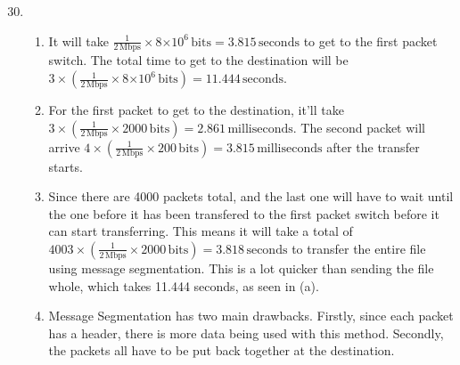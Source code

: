 \documentclass[12pt]{article}
\newcommand{\s}[1]{\setcounter{enumi}{#1}}
\newcommand{\unit}[1]{\ensuremath{\, \mathrm{#1}}}
\newcommand{\e}[1]{\ensuremath{\times 10^{#1}}}
\begin{document}
\begin{enumerate}
  \s{29}
  \item
    \begin{enumerate}
      \item It will take $\frac{1}{2 \unit{Mbps}} \times 8\e{6} \unit{bits} = 3.815 \unit{seconds}$ to get to the first packet switch. The total time to get to the destination will be $3 \times \left(\frac{1}{2 \unit{Mbps}} \times 8\e{6} \unit{bits} \right) = 11.444 \unit{seconds}$.
      \item For the first packet to get to the destination, it'll take $3 \times \left(\frac{1}{2 \unit{Mbps}} \times 2000 \unit{bits} \right) = 2.861 \unit{milliseconds}$. The second packet will arrive $4 \times \left(\frac{1}{2 \unit{Mbps}} \times 200 \unit{bits} \right) = 3.815 \unit{milliseconds}$ after the transfer starts.
      \item Since there are 4000 packets total, and the last one will have to wait until the one before it has been transfered to the first packet switch before it can start transferring. This means it will take a total of $4003 \times \left(\frac{1}{2 \unit{Mbps}} \times 2000 \unit{bits} \right) = 3.818 \unit{seconds}$ to transfer the entire file using message segmentation. This is a lot quicker than sending the file whole, which takes 11.444 seconds, as seen in (a).
      \item Message Segmentation has two main drawbacks. Firstly, since each packet has a header, there is more data being used with this method. Secondly, the packets all have to be put back together at the destination.
    \end{enumerate}
\end{enumerate}
\end{document}
